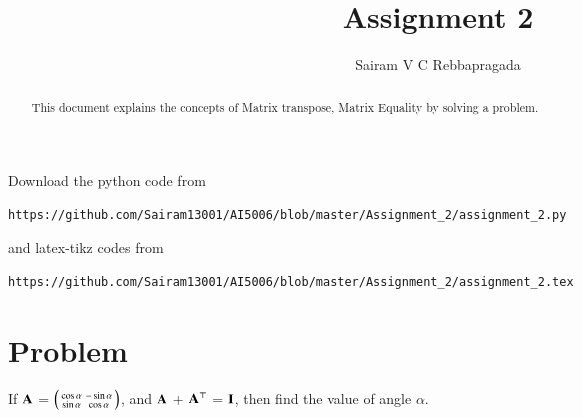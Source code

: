 \documentclass[journal,12pt,twocolumn]{IEEEtran}
\begin{document}
\renewcommand{\thefigure}{\theproblem}
\def\putbox#1#2#3{\makebox[0in][l]{\makebox[#1][l]{}\raisebox{\baselineskip}[0in][0in]{\raisebox{#2}[0in][0in]{#3}}}}
     \def\rightbox#1{\makebox[0in][r]{#1}}
     \def\centbox#1{\makebox[0in]{#1}}
     \def\topbox#1{\raisebox{-\baselineskip}[0in][0in]{#1}}
     \def\midbox#1{\raisebox{-0.5\baselineskip}[0in][0in]{#1}}
\vspace{3cm}
\title{Assignment 2}
\author{Sairam V C Rebbapragada}
\maketitle
\newpage
\bigskip
\renewcommand{\thefigure}{\theenumi}
\renewcommand{\thetable}{\theenumi}
\begin{abstract}
This document explains the concepts of Matrix transpose, Matrix Equality by solving a problem.
\end{abstract}
Download the python code from 
%
\begin{lstlisting}
https://github.com/Sairam13001/AI5006/blob/master/Assignment_2/assignment_2.py
\end{lstlisting}
%
and latex-tikz codes from 
%
\begin{lstlisting}
https://github.com/Sairam13001/AI5006/blob/master/Assignment_2/assignment_2.tex
\end{lstlisting}
%
\section{Problem}
If $\mathbf{A}$  = $\begin{psmallmatrix} \cos{\alpha} & -\sin{\alpha}\\ \sin{\alpha} & \cos{\alpha} \end{psmallmatrix}$, and $\mathbf{A}$ + $\mathbf{A}^\top$ = $\mathbf{I}$, then find the value of angle $\alpha$.
\end{document}
